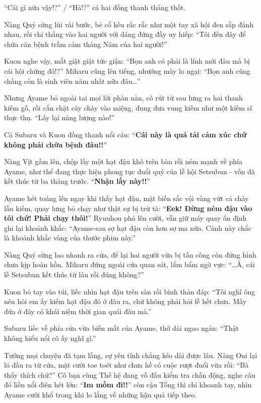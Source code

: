 \documentclass[../main.tex]{subfiles}
\begin{document}
``Cái gì nữa vậy!?'' / ``Hả!?'' cả hai đồng thanh thảng thốt.

Nàng Quỷ sừng lùi vài bước, bẻ cổ kêu rắc rắc như một tay xã hội đen sắp đánh nhau, rồi chỉ thẳng vào hai người với dáng đứng đầy uy hiếp: ``Tôi đến đây để chữa căn bệnh trầm cảm tháng Năm của hai người!''

Kuon nghe vậy, mắt giật giật tức giận: ``Bọn anh có phải là lính mới đâu mà bị cái hội chứng đó!?'' Miharu cũng lên tiếng, nhướng mày lo ngại: ``Bọn anh cũng chẳng còn là sinh viên năm nhất nữa đâu\dots''

Nhưng Ayame bỏ ngoài tai mọi lời phàn nàn, cô rút từ sau lưng ra hai thanh kiếm gỗ, rồi cắn chặt cây chày vào miệng, đung đưa vung kiếm như một kiếm sĩ thực thụ. ``Lấy lại năng lượng nào!''

Cả Subaru và Kuon đồng thanh nổi cáu: ``\textbf{Cái này là quá tải cảm xúc chứ không phải chữa bệnh đâu!!}''


Nàng Vịt gầm lên, chộp lấy một hạt đậu khô trên bàn rồi ném mạnh về phía Ayame, như thể đang thực hiện phong tục đuổi quỷ của lễ hội Setsubun - vốn đã kết thúc từ ba tháng trước. ``\textbf{Nhận lấy này!!}''

Ayame hét toáng lên ngay khi thấy hạt đậu, mặt biến sắc vội vàng vứt cả chày lẫn kiếm, quay lưng bỏ chạy như thật sự bị trừ tà: ``\textbf{Eek! Đừng ném đậu vào tôi chứ! Phải chạy thôi!}'' Ryuuhou phá lên cười, vẫn giữ máy quay ổn định ghi lại khoảnh khắc: ``Ayame-san sợ hạt đậu còn hơn sợ ma nữa. Cảnh này chắc là khoảnh khắc vàng của thước phim này.''

Nàng Quỷ sừng lao nhanh ra cửa, để lại hai người vừa bị tấn công còn đứng hình chưa kịp hoàn hồn. Miharu đứng ngoài cửa quan sát, lẩm bẩm ngờ vực: ``\dots À, cái lễ Setsubun kết thúc từ lâu rồi đúng không?''

Kuon bỏ tay vào túi, liếc nhìn hạt đậu trên sàn rồi bình thản đáp: ``Tôi nghĩ ông nên hỏi em ấy kiếm hạt đậu đó ở đâu ra, chứ không phải hỏi lễ hết chưa. Mấy đứa ở đây có khái niệm thời gian quái đâu mà.''

Subaru liếc về phía cửa vừa biến mất của Ayame, thở dài ngao ngán: ``Thật không hiểu nổi cô ấy nghĩ gì.''

Tưởng mọi chuyện đã tạm lắng, sự yên tĩnh chẳng kéo dài được lâu. Nàng Oni lại ló đầu ra từ cửa, mặt cười toe toét như chưa hề có cuộc rượt đuổi vừa rồi: ``Bà thấy thích chứ?'' Cô bạn cùng Thế hệ đang vỗ đầu kiểm tra chấn động, nghe câu đó liền nổi điên hét lớn: ``\textbf{Im mồm đi!!}'' còn cậu Tổng thì chỉ khoanh tay, nhìn Ayame cười khổ trong khi lo lắng về những hậu quả tiếp theo.
\end{document}
